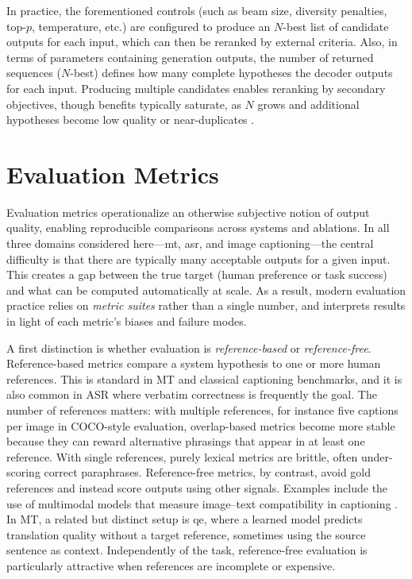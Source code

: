In practice, the forementioned controls (such as beam size, diversity penalties, top-\(p\), temperature, etc.) are configured to produce an
\(N\)-best list of candidate outputs for each input, which can then be reranked by external criteria.
Also, in terms of parameters containing generation outputs, the number of returned sequences (\(N\)-best) defines how many complete hypotheses the decoder outputs for each input. Producing multiple candidates enables reranking by secondary objectives, though benefits typically saturate, as \(N\) grows and additional
hypotheses become low quality or near-duplicates \cite{och2003mert}.




\section{Evaluation Metrics}
Evaluation metrics operationalize an otherwise subjective notion of output quality, enabling reproducible comparisons across systems and ablations. In all three domains considered here---\gls{mt}, \gls{asr}, and image captioning---the central difficulty is that there are typically many acceptable outputs for a given input. This creates a gap between the true target (human preference or task success) and what can be computed automatically at scale. As a result, modern evaluation practice relies on \emph{metric suites} rather than a single number, and interprets results in light of each metric's biases and failure modes.

A first distinction is whether evaluation is \emph{reference-based} or \emph{reference-free}. Reference-based metrics compare a system hypothesis to one or more human references. This is standard in MT and classical captioning benchmarks, and it is also common in ASR where verbatim correctness is frequently the goal. The number of references matters: with multiple references, for instance five captions per image in COCO-style evaluation, overlap-based metrics become more stable because they can reward alternative phrasings that appear in at least one reference. With single references, purely lexical metrics are brittle, often under-scoring correct paraphrases. Reference-free metrics, by contrast, avoid gold references and instead score outputs using other signals. Examples include the use of multimodal models that measure image--text compatibility in captioning \cite{hessel-etal-2021-clipscore}. In MT, a related but distinct setup is \gls{qe}, where a learned model predicts translation quality without a target reference, sometimes using the source sentence as context. Independently of the task, reference-free evaluation is particularly attractive when references are incomplete or expensive.

